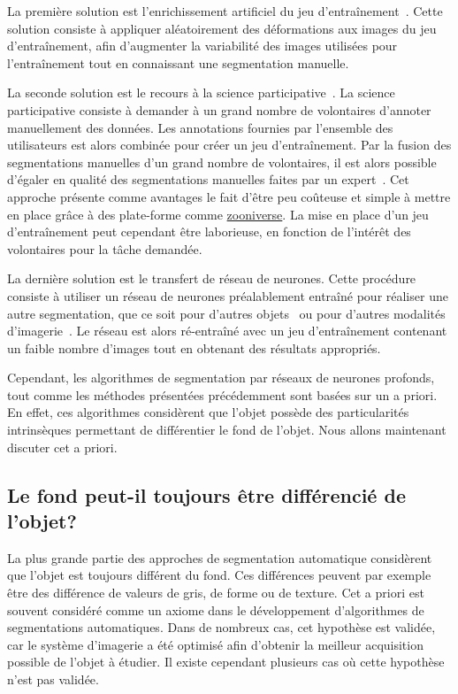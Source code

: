 \documentclass[\main/main.tex]{subfiles}
\begin{document}
%
La première solution est l'enrichissement artificiel du jeu d'entraînement~\cite{milletari_2016,zhao_2019b,majurski_2019}.
%
Cette solution consiste à appliquer aléatoirement des déformations aux images du jeu d'entraînement,
afin d'augmenter la variabilité des images utilisées pour l'entraînement tout en connaissant une segmentation manuelle.

%
La seconde solution est le recours à la science participative~\cite{willi_2019,keshavan_2019}.
%
La science participative consiste à demander à un grand nombre de volontaires d'annoter manuellement des données.
%
Les annotations fournies par l'ensemble des utilisateurs est alors combinée pour créer un jeu d'entraînement.
%
Par la fusion des segmentations manuelles d'un grand nombre de volontaires,
il est alors possible d'égaler en qualité des segmentations manuelles faites par un expert~\cite{meakin_2019}.
%
Cet approche présente comme avantages le fait d'être peu coûteuse et simple à mettre en place grâce à des plate\hyp{}forme comme \href{https://www.zooniverse.org/}{zooniverse}.
%
La mise en place d'un jeu d'entraînement peut cependant être laborieuse,
en fonction de l'intérêt des volontaires pour la tâche demandée.

%
La dernière solution est le transfert de réseau de neurones.
%
Cette procédure consiste à utiliser un réseau de neurones préalablement entraîné pour réaliser une autre segmentation, que ce soit pour d'autres objets~\cite{wahab_2019} ou pour d'autres modalités d'imagerie~\cite{guo_2019}.
%
Le réseau est alors ré\hyp{}entraîné avec un jeu d'entraînement contenant un faible nombre d'images tout en obtenant des résultats appropriés.

Cependant, les algorithmes de segmentation par réseaux de neurones profonds, tout comme les méthodes présentées précédemment sont basées sur un a priori.
%
En effet, ces algorithmes considèrent que l'objet possède des particularités intrinsèques permettant de différentier le fond de l'objet.
%
Nous allons maintenant discuter cet a priori.

    \subsection{Le fond peut\hyp{}il toujours être différencié  de l'objet?}

%
La plus grande partie des approches de segmentation automatique considèrent que l'objet est toujours différent du fond.
Ces différences peuvent par exemple être des différence de valeurs de gris, de forme ou de texture.
%
Cet a priori est souvent considéré comme un axiome dans le développement d'algorithmes de segmentations automatiques.
%
Dans de nombreux cas, cet hypothèse est validée, car le système d'imagerie a été optimisé afin d'obtenir la meilleur acquisition possible de l'objet à étudier.
%
Il existe cependant plusieurs cas où cette hypothèse n'est pas validée.
\end{document}
